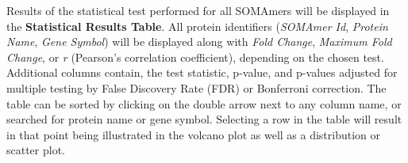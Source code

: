 \documentclass[
]{book}
\begin{document}
Results of the statistical test performed for all SOMAmers will be displayed in the \textbf{Statistical Results Table}. All protein identifiers (\emph{SOMAmer Id}, \emph{Protein Name}, \emph{Gene Symbol}) will be displayed along with \emph{Fold Change}, \emph{Maximum Fold Change}, or \emph{r} (Pearson's correlation coefficient), depending on the chosen test. Additional columns contain, the test statistic, p-value, and p-values adjusted for multiple testing by False Discovery Rate (FDR) or Bonferroni correction. The table can be sorted by clicking on the double arrow next to any column name, or searched for protein name or gene symbol. Selecting a row in the table will result in that point being illustrated in the volcano plot as well as a distribution or scatter plot.
\end{document}
